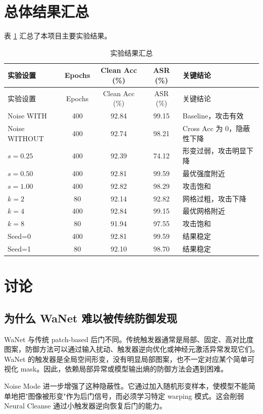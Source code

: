 \documentclass[UTF8,zihao=-4]{ctexart}
\begin{document}
\section{总体结果汇总}

表 \ref{tab:summary} 汇总了本项目主要实验结果。

\begin{longtable}{lcccl}
\caption{实验结果汇总}
\label{tab:summary}\\
\toprule
实验设置 & Epochs & Clean Acc (\%) & ASR (\%) & 关键结论 \\
\midrule
\endfirsthead
\toprule
实验设置 & Epochs & Clean Acc (\%) & ASR (\%) & 关键结论 \\
\midrule
\endhead
Noise WITH & 400 & 92.84 & 99.15 & Baseline，攻击有效 \\
Noise WITHOUT & 400 & 92.74 & 98.21 & Cross Acc 为 0，隐蔽性下降 \\
$s=0.25$ & 400 & 92.39 & 74.12 & 形变过弱，攻击明显下降 \\
$s=0.50$ & 400 & 92.81 & 99.59 & 最优强度附近 \\
$s=1.00$ & 400 & 92.82 & 98.29 & 攻击饱和 \\
$k=2$ & 80 & 92.14 & 92.82 & 网格过粗，攻击下降 \\
$k=4$ & 400 & 92.84 & 99.15 & 最优网格附近 \\
$k=8$ & 80 & 91.94 & 97.55 & 攻击饱和 \\
Seed=0 & 400 & 92.81 & 99.59 & 结果稳定 \\
Seed=1 & 80 & 92.10 & 98.70 & 结果稳定 \\
\bottomrule
\end{longtable}

\section{讨论}

\subsection{为什么 WaNet 难以被传统防御发现}

WaNet 与传统 patch-based 后门不同。传统触发器通常是局部、固定、高对比度图案，防御方法可以通过输入扰动、触发器逆向优化或神经元激活异常发现它们。WaNet 的触发器是全局空间形变，没有明显局部图案，也不一定对应某个简单可视化 mask。因此，依赖局部异常或模型输出熵的防御方法会遇到困难。

Noise Mode 进一步增强了这种隐蔽性。它通过加入随机形变样本，使模型不能简单地把"图像被形变"作为后门信号，而必须学习特定 warping 模式。这会削弱 Neural Cleanse 通过小触发器逆向恢复后门的能力。
\end{document}
